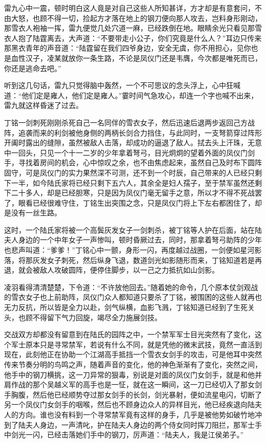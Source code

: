 雷九心中一震，顿时明白这人竟是对自己这些人所知甚详，方才却是有意套问，不由大怒，也顾不得一切，捡起方才落在地上的钢刀便向那人攻去，岂料身形刚动，那雪衣人袍袖一挥，雷九便觉几处穴道一麻，已经跌倒在地。眼睛余光只看见那雪衣人抱了陆霆离去，大声道：“不要带走小公子，你们究竟是什么人？”耳边只传来那黑衣青年的声音道：“陆霆留在我们四爷身边，安全无虞，你不用担心，见你也是血性汉子，凌某就放你一条生路，不论是凤仪门还是韦膺，今次都是唯死而已，你还是逃命去吧。”

听到这几句话，雷九只觉得脑中轰然，一个不可思议的念头浮上，心中狂喊道：“他们定是雍人，他们定是雍人。”霎时间气急攻心，却连一个字也喊不出来，雷九就这样昏迷了过去。

丁铭一剑刺死刚刚杀死自己一名同伴的雪衣女子，然后迅速后退两步返回己方战阵，追袭而来的利剑被他身侧的两柄长剑合力挡住，与此同时，一支弩箭穿过阵形开阖时露出的缝隙，虽然被敌人击落，却成功的逼退了敌人。拭去头上汗珠，无意中一回头，只见一个十一二岁的少年拿着弩弓，目光炯炯的望着外面的凤仪门剑手，寻找着房间的机会，心中惊叹之余，也不由焦虑起来，虽然自己及时布下圆阵固守，可是凤仪门的实力果然深不可测，还不到一个时辰，自己带来的人已经只剩下一半，如今陆氏家将已经只剩下五六人，其余全是妇人孺子，至于禁军虽然还剩下二十多人，却是已经胆寒，只是因为凤仪门毫无留手之意，所以才不得不死战罢了，眼看已经很难守住，丁铭生出突围之念，只是凤仪门将上下左右都困住了，却是没有一丝生路。

这时，一个陆氏家将被一个高鬓灰发女子一剑刺杀，被丁铭等人护在后面，站在陆夫人身边的一个中年女子一声惨叫，顿时昏厥过去，同时，那拿着弩弓助阵的少年也悲声叫道：“爹爹！”丁铭心中一颤，身形一闪，再度越过战圈，一剑便如星河影落，将那灰发女子刺死，然后纵身飞退，数道剑光如影随形而来，丁铭知道若是再退，就会被敌人攻破圆阵，便停住脚步，以一己之力抵抗如山剑影。

凌羽看得清清楚楚，下令道：“不许放他回去。”随着她的命令，几个原本仗剑观战的雪衣女子也上前助阵，凤仪门众人都知道只要杀了丁铭，被围困的这些人就再也无力反抗，所以皆是全力以赴，剑气纵横，血影飞溅，丁铭知道已经到了生死关头，也顾不得留下气力回旋，竭尽全力施展剑技。

交战双方却都没有留意到在陆氏的园阵之中，一个禁军军士目光突然有了变化，这个军士原本只是寻常禁军，若说有什么不同，就是凭他的微末武技，竟然一直活到现在，此刻他正在协助一个江湖高手抵挡一个雪衣女剑手的攻击，可是他耳中突然传来节奏分明的鸟鸣之声，随着声音的变化，他的神色渐渐有了变化，突然之间，他手中的钢刀横挑，这一刀异常的狠毒，别说是对面的凤仪门女剑手，就是和他并肩作战的那个吴越义军的高手也是一怔，就在这一瞬间，这一刀已经切入了那女剑手胸腹，然后他已经顺势夺过那女剑手的长剑，剑光暴射，便如流星电闪，切断了另一个凤仪门女剑手的咽喉，然后也不顾身边众人的异样目光，他已经疾退向陆夫人的方向。谁也没有料到一个寻常禁军竟有这样的身手，几乎是被他势如破竹地冲到了陆夫人身边，一声清叱，护在陆夫人身边的两个侍女同时挥刀阻拦，那军士手中剑光一闪，已经击落她们手中的钢刀，厉声道：“陆夫人，我是江侯弟子。”

